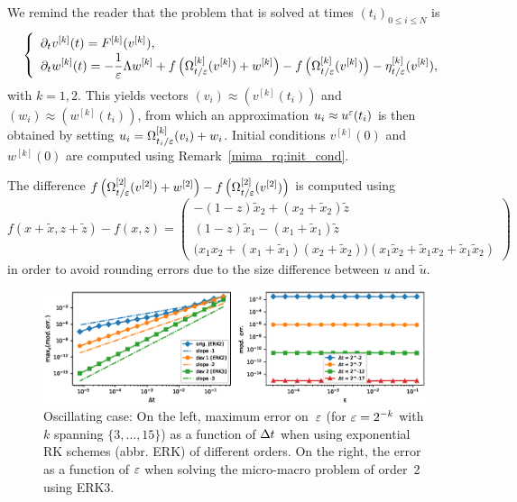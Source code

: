 We remind the reader that the problem that is solved at times $(t_i)_{0
\leq i \leq N}$ is 
$$
\renewcommand{\arraystretch}{1.4}
\left \{
\begin{array}{ll}
  \dpt v^{[k]}(t) = F^{[k]}(v^{[k]}) ,
  \\ \displaystyle
  \dpt w^{[k]}(t) = - \inveps \Lambda w^{[k]} 
  + f\left( \Omega^{[k]}_{t/\eps}(v^{[k]}) + w^{[k]} \right) 
  - f\left( \Omega^{[k]}_{t/\eps}(v^{[k]}) \right) 
  - \eta^{[k]}_{t/\eps}(v^{[k]}) ,
\end{array}
\right .
$$
with $k = 1,2$. This yields vectors $(v_i) \approx (v^{[k]}(t_i))$ and
$(w_i) \approx (w^{[k]}(t_i))$, from which an approximation $u_i \approx
u^{\varepsilon}(t_i)$ is then obtained by setting $ u_i =
\Omega^{[k]}_{t_i/\varepsilon}(v_i) + w_i $. Initial conditions $v^{[k]}(0)$ and
$w^{[k]}(0)$ are computed using Remark~\ref{mima_rq:init_cond}. 

The difference $ f\left( \Omega^{[2]}_{t/\varepsilon}(v^{[2]}) + w^{[2]} \right) 
- f\left( \Omega^{[2]}_{t/\varepsilon}(v^{[2]}) \right) $ is computed using 
$$ 
\newcommand{\dx}{\tilde{x}}
\newcommand{\dz}{\tilde{z}}
  f(x+\dx, z+\dz) - f(x,z) = \begin{pmatrix}
  -(1 - z) \dx_2 + (x_2 + \dx_2) \dz \\
  (1 - z) \dx_1 - (x_1 + \dx_1) \dz \\
  \big( x_1 x_2 + (x_1+\dx_1)(x_2 + \dx_2) \big) 
  \left( x_1 \dx_2 + \dx_1 x_2 + \dx_1 \dx_2 \right)
  \end{pmatrix}
$$
in order to avoid rounding errors due to the size difference between $u$
and $\tilde{u}$. 

\begin{figure}
\vspace*{-12pt}
\includegraphics[width=\textwidth]{./miMa_Dissipatif/cv_oscill_max_err_and_dev2.eps}
\vspace*{-24pt}
\caption{Oscillating case: On the left, maximum error on~$\varepsilon$ (for $\varepsilon
= 2^{-k}$ with $k$ spanning $\{3, \ldots, 15\}$) as a function of $\Delta t$
when using exponential RK schemes (abbr. ERK) of different orders. On the
right, the error as a function of $\varepsilon$ when solving the micro-macro
problem of order~2 using ERK3.}
\label{tests_fig:oscill}
\end{figure}


